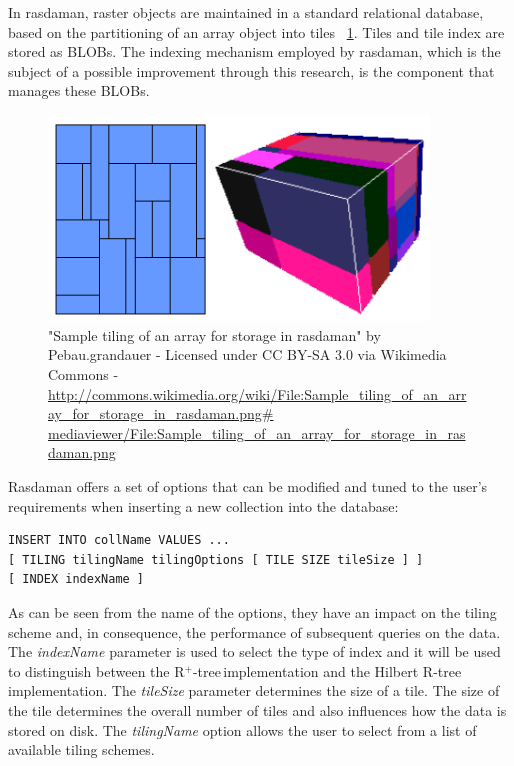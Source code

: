 \documentclass[11pt, a4paper, oneside]{article}
\newcommand{\rplus}{R$^+$-tree$\,$}
\begin{document}
In rasdaman, raster objects are maintained in a standard relational database, based on the partitioning of an array object into tiles\cite{DBLP:conf/icde/FurtadoB99} ~\ref{fig:rasdaman-tile}. Tiles and tile index are stored as BLOBs. The indexing mechanism employed by rasdaman, which is the subject of a possible improvement through this research, is the component that manages these BLOBs.

\begin{figure}[h!]
  \centering
    \includegraphics[width=0.9\textwidth]{img/tiling}
    \caption{"Sample tiling of an array for storage in rasdaman" by Pebau.grandauer - Licensed under CC BY-SA 3.0 via Wikimedia Commons -\url{http://commons.wikimedia.org/wiki/File:Sample_tiling_of_an_array_for_storage_in_rasdaman.png\# mediaviewer/File:Sample_tiling_of_an_array_for_storage_in_rasdaman.png }}
  \label{fig:rasdaman-tile}
\end{figure}

Rasdaman offers a set of options that can be modified and tuned to the user's requirements when inserting a new collection into the database:

\begin{verbatim}
INSERT INTO collName VALUES ...
[ TILING tilingName tilingOptions [ TILE SIZE tileSize ] ]
[ INDEX indexName ]
\end{verbatim}

As can be seen from the name of the options, they have an impact on the tiling scheme and, in consequence, the performance of subsequent queries on the data. The \textit{indexName} parameter is used to select the type of index and it will be used to distinguish between the \rplus implementation and the Hilbert R-tree implementation. The \textit{tileSize} parameter determines the size of a tile. The size of the tile determines the overall number of tiles and also influences how the data is stored on disk. The \textit{tilingName} option allows the user to select from a list of available tiling schemes. 
\end{document}
